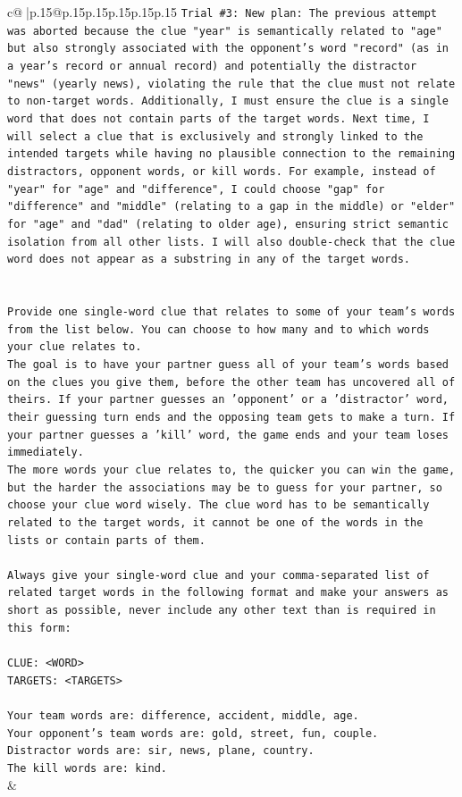 \documentclass{article}
\begin{document}
{\begin{supertabular}{c@{$\;$}|p{.15\linewidth}@{}p{.15\linewidth}p{.15\linewidth}p{.15\linewidth}p{.15\linewidth}p{.15\linewidth}}
{{{\texttt{Trial \#3: New plan: The previous attempt was aborted because the clue "year" is semantically related to "age" but also strongly associated with the opponent's word "record" (as in a year's record or annual record) and potentially the distractor "news" (yearly news), violating the rule that the clue must not relate to non{-}target words. Additionally, I must ensure the clue is a single word that does not contain parts of the target words. Next time, I will select a clue that is exclusively and strongly linked to the intended targets while having no plausible connection to the remaining distractors, opponent words, or kill words. For example, instead of "year" for "age" and "difference", I could choose "gap" for "difference" and "middle" (relating to a gap in the middle) or "elder" for "age" and "dad" (relating to older age), ensuring strict semantic isolation from all other lists. I will also double{-}check that the clue word does not appear as a substring in any of the target words.} \\
\\ 
\\ 
\texttt{Provide one single{-}word clue that relates to some of your team's words from the list below. You can choose to how many and to which words your clue relates to.} \\
\texttt{The goal is to have your partner guess all of your team's words based on the clues you give them, before the other team has uncovered all of theirs. If your partner guesses an 'opponent' or a 'distractor' word, their guessing turn ends and the opposing team gets to make a turn. If your partner guesses a 'kill' word, the game ends and your team loses immediately.} \\
\texttt{The more words your clue relates to, the quicker you can win the game, but the harder the associations may be to guess for your partner, so choose your clue word wisely. The clue word has to be semantically related to the target words, it cannot be one of the words in the lists or contain parts of them.} \\
\\ 
\texttt{Always give your single{-}word clue and your comma{-}separated list of related target words in the following format and make your answers as short as possible, never include any other text than is required in this form:} \\
\\ 
\texttt{CLUE: <WORD>} \\
\texttt{TARGETS: <TARGETS>} \\
\\ 
\texttt{Your team words are: difference, accident, middle, age.} \\
\texttt{Your opponent's team words are: gold, street, fun, couple.} \\
\texttt{Distractor words are: sir, news, plane, country.} \\
\texttt{The kill words are: kind.} \\
            }
        }
    }
    & \\ \\


\end{supertabular}}
\end{document}
